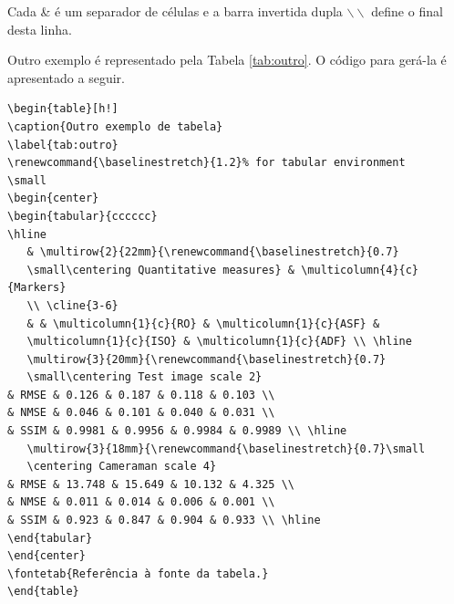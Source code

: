 Cada \& é um separador de células e a barra invertida dupla $\backslash\backslash$ define o final desta linha.

Outro exemplo é representado pela Tabela \ref{tab:outro}. O código para gerá-la é apresentado a seguir.

\begin{verbatim}
\begin{table}[h!]
\caption{Outro exemplo de tabela}
\label{tab:outro}
\renewcommand{\baselinestretch}{1.2}% for tabular environment
\small
\begin{center}
\begin{tabular}{cccccc}
\hline
   & \multirow{2}{22mm}{\renewcommand{\baselinestretch}{0.7}
   \small\centering Quantitative measures} & \multicolumn{4}{c}{Markers} 
   \\ \cline{3-6}
   & & \multicolumn{1}{c}{RO} & \multicolumn{1}{c}{ASF} & 
   \multicolumn{1}{c}{ISO} & \multicolumn{1}{c}{ADF} \\ \hline
   \multirow{3}{20mm}{\renewcommand{\baselinestretch}{0.7}
   \small\centering Test image scale 2}
& RMSE & 0.126 & 0.187 & 0.118 & 0.103 \\
& NMSE & 0.046 & 0.101 & 0.040 & 0.031 \\
& SSIM & 0.9981 & 0.9956 & 0.9984 & 0.9989 \\ \hline
   \multirow{3}{18mm}{\renewcommand{\baselinestretch}{0.7}\small
   \centering Cameraman scale 4}
& RMSE & 13.748 & 15.649 & 10.132 & 4.325 \\
& NMSE & 0.011 & 0.014 & 0.006 & 0.001 \\
& SSIM & 0.923 & 0.847 & 0.904 & 0.933 \\ \hline
\end{tabular}
\end{center}
\fontetab{Referência à fonte da tabela.}
\end{table}
\end{verbatim}

